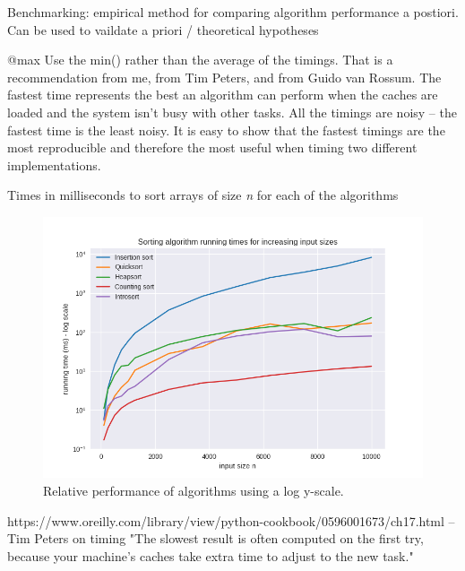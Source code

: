 \documentclass[12pt, a4paper]{article}
\begin{document}
Benchmarking: empirical method for comparing algorithm performance a postiori. Can be used to vaildate a priori / theoretical hypotheses

@max Use the min() rather than the average of the timings. That is a recommendation from me, from Tim Peters, and from Guido van Rossum. The fastest time represents the best an algorithm can perform when the caches are loaded and the system isn't busy with other tasks. All the timings are noisy -- the fastest time is the least noisy. It is easy to show that the fastest timings are the most reproducible and therefore the most useful when timing two different implementations.



\begin{table}[h]
    \resizebox{\textwidth}{!}{%
    
    }
\caption{Times in milliseconds to sort arrays of size \emph{n} for each of the algorithms}
\end{table}

\begin{figure}
    \includegraphics[width=\linewidth]{bm_output/plot_0_log_20210510-153504.png}
    \caption{Relative performance of algorithms using a log y-scale.}
    \label{fig:log-perf}
  \end{figure}


https://www.oreilly.com/library/view/python-cookbook/0596001673/ch17.html 
-- Tim Peters on timing \textcite{peters2002}
"The slowest result is often computed on the first try, because your machine’s caches take extra time to adjust to the new task."




\printbibliography
\end{document}
